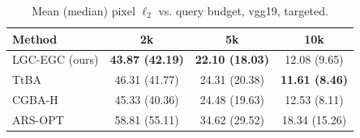 \begin{table}[t]
\centering\footnotesize
\caption{Mean (median) pixel $\ell_2$ vs. query budget, vgg19, targeted.}
\begin{tabular}{lccc}
\toprule
Method & 2k & 5k & 10k \\
\midrule
LGC-EGC (ours) & \textbf{43.87 (42.19)} & \textbf{22.10 (18.03)} & 12.08 (9.65) \\
TtBA & 46.31 (41.77) & 24.31 (20.38) & \textbf{11.61 (8.46)} \\
CGBA-H & 45.33 (40.36) & 24.48 (19.63) & 12.53 (8.11) \\
ARS-OPT & 58.81 (55.11) & 34.62 (29.52) & 18.34 (15.26) \\
\bottomrule
\end{tabular}
\end{table}
